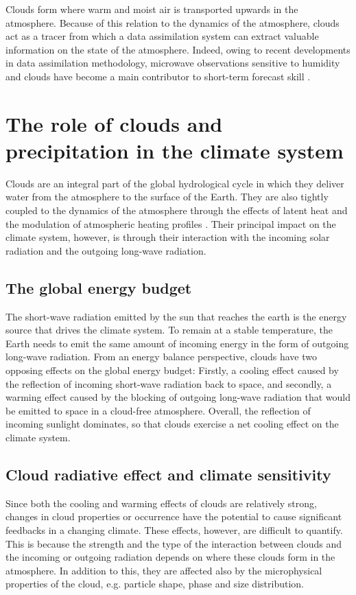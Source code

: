 Clouds form where warm and moist air is transported upwards in the atmosphere.
Because of this relation to the dynamics of the atmosphere, clouds act as a
tracer from which a data assimilation system can extract valuable
information on the state of the atmosphere. Indeed, owing to recent developments
in data assimilation methodology, microwave observations sensitive to humidity
and clouds have become a main contributor to short-term forecast skill
\cite{geer17}.

\section{The role of clouds and precipitation in the climate system}

Clouds are an integral part of the global hydrological cycle in which they
deliver water from the atmosphere to the surface of the Earth. They are also
tightly coupled to the dynamics of the atmosphere through the effects of latent
heat and the modulation of atmospheric heating profiles \parencite{bony15}. Their
principal impact on the climate system, however, is through their interaction
with the incoming solar radiation and the outgoing long-wave radiation.

\subsection{The global energy budget}

The short-wave radiation emitted by the sun that reaches the earth is the energy
source that drives the climate system. To remain at a stable temperature, the
Earth needs to emit the same amount of incoming energy in the form of outgoing
long-wave radiation. From an energy balance perspective, clouds have two
opposing effects on the global energy budget: Firstly, a cooling effect caused
by the reflection of incoming short-wave radiation back to space, and secondly,
a warming effect caused by the blocking of outgoing long-wave radiation that
would be emitted to space in a cloud-free atmosphere. Overall, the reflection
of incoming sunlight dominates, so that clouds exercise a net cooling effect on
the climate system.

\subsection{Cloud radiative effect and climate sensitivity}

Since both the cooling and warming effects of clouds are relatively strong,
changes in cloud properties or occurrence have the potential to cause significant
feedbacks in a changing climate. These effects, however, are difficult to
quantify. This is because the strength and the type of the interaction between
clouds and the incoming or outgoing radiation depends on where these clouds form
in the atmosphere. In addition to this, they are affected also by the
microphysical properties of the cloud, e.g. particle shape, phase and size
distribution.

